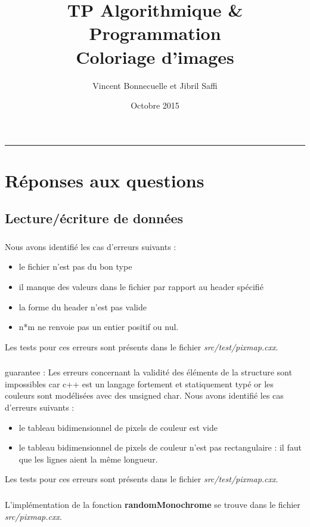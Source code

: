 \documentclass[10pt,a4paper]{article}
\title{\textbf{TP Algorithmique \& Programmation} \\ Coloriage d'images}
\author{Vincent Bonnecuelle et Jibril Saffi}
\date{Octobre 2015}
\begin{document}
\maketitle
\hrule
\section*{Réponses aux questions}
\subsection{Lecture/écriture de données}
\subsubsection{} 
Nous avons identifié les cas d'erreurs suivants :
\begin{itemize}
\item le fichier n'est pas du bon type
\item il manque des valeurs dans le fichier par rapport au header spécifié
\item la forme du header n'est pas valide 
\item n*m ne renvoie pas un entier positif ou nul.
\end{itemize}
Les tests pour ces erreurs sont présents dans le fichier \textit{src/test/pixmap.cxx}.

\subsubsection{}
guarantee : Les erreurs concernant la validité des éléments de la structure sont impossibles car c++ est un langage fortement et statiquement typé or les couleurs sont modélisées avec des unsigned char.  
Nous avons identifié les cas d'erreurs suivants :
\begin{itemize}
\item le tableau bidimensionnel de pixels de couleur est vide
\item le tableau bidimensionnel de pixels de couleur n'est pas rectangulaire : il faut que les lignes aient la même longueur.
\end{itemize}
Les tests pour ces erreurs sont présents dans le fichier \textit{src/test/pixmap.cxx}.

\subsubsection{}
L'implémentation de la fonction \textbf{randomMonochrome} se trouve dans le fichier \textit{src/pixmap.cxx}.
\end{document}
